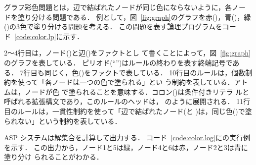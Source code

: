 グラフ彩色問題とは，辺で結ばれたノードが同じ色にならないように，各ノー
ドを塗り分ける問題である．
例として，図~\ref{fig:graph}のグラフを赤()，青()，緑
()の3色で塗り分ける問題を考える．
この問題を表す論理プログラムをコード~\ref{code:color.lp}に示す．

2〜4行目は，ノード()と辺()をファクトとし
て書くことによって，図~\ref{fig:graph}のグラフを表している．
ピリオド(``'')はルールの終わりを表す終端記号である．
7行目も同じく，色()をファクトで表している．
%
10行目のルールは，個数制約を使って「各ノードは一つの色で塗られる」とい
う制約を表している．アトムは，ノードが色
で塗られることを意味する．コロン(\code{:})は条件付きリテラ
ルと呼ばれる拡張構文であり，このルールのヘッドは，
のように展開される．
11行目のルールは，一貫性制約を使って「辺で結ばれたノード(と
)は，同じ色()で塗られない」という制約を表している．

ASP システムは解集合を計算して出力する．
コード~\ref{code:color.log}に{\clingo}の実行例を示す．
この出力から，ノード1と5は緑，ノード4と6は赤，ノード2と3は青に塗り分け
られることがわかる．




